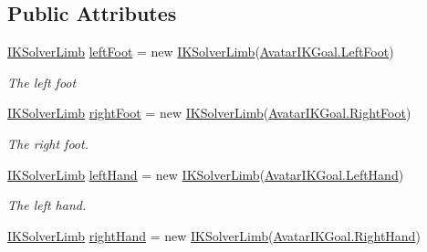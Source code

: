 \subsection*{Public Attributes}
\begin{DoxyCompactItemize}
\item 
\mbox{\hyperlink{class_root_motion_1_1_final_i_k_1_1_i_k_solver_limb}{I\+K\+Solver\+Limb}} \mbox{\hyperlink{class_root_motion_1_1_final_i_k_1_1_biped_i_k_solvers_aec701b71b2b3697df1ff49632cb41468}{left\+Foot}} = new \mbox{\hyperlink{class_root_motion_1_1_final_i_k_1_1_i_k_solver_limb}{I\+K\+Solver\+Limb}}(\mbox{\hyperlink{namespace_root_motion_1_1_final_i_k_ae0dd2058c7667b6f132c11a6b860c14aae81960506fa9c17a1fa39c529ae1bf50}{Avatar\+I\+K\+Goal.\+Left\+Foot}})
\begin{DoxyCompactList}\small\item\em The left foot \end{DoxyCompactList}\item 
\mbox{\hyperlink{class_root_motion_1_1_final_i_k_1_1_i_k_solver_limb}{I\+K\+Solver\+Limb}} \mbox{\hyperlink{class_root_motion_1_1_final_i_k_1_1_biped_i_k_solvers_a0d2177edd1129de6be2b44c965337b1e}{right\+Foot}} = new \mbox{\hyperlink{class_root_motion_1_1_final_i_k_1_1_i_k_solver_limb}{I\+K\+Solver\+Limb}}(\mbox{\hyperlink{namespace_root_motion_1_1_final_i_k_ae0dd2058c7667b6f132c11a6b860c14aac901c64cc70540fbd6d7f6c71b047a6a}{Avatar\+I\+K\+Goal.\+Right\+Foot}})
\begin{DoxyCompactList}\small\item\em The right foot. \end{DoxyCompactList}\item 
\mbox{\hyperlink{class_root_motion_1_1_final_i_k_1_1_i_k_solver_limb}{I\+K\+Solver\+Limb}} \mbox{\hyperlink{class_root_motion_1_1_final_i_k_1_1_biped_i_k_solvers_a3aac72ddabdd676c6b6f281fc4b38a60}{left\+Hand}} = new \mbox{\hyperlink{class_root_motion_1_1_final_i_k_1_1_i_k_solver_limb}{I\+K\+Solver\+Limb}}(\mbox{\hyperlink{namespace_root_motion_1_1_final_i_k_ae0dd2058c7667b6f132c11a6b860c14aa03f7bbbc02c9006ea393ec4ef5843d7b}{Avatar\+I\+K\+Goal.\+Left\+Hand}})
\begin{DoxyCompactList}\small\item\em The left hand. \end{DoxyCompactList}\item 
\mbox{\hyperlink{class_root_motion_1_1_final_i_k_1_1_i_k_solver_limb}{I\+K\+Solver\+Limb}} \mbox{\hyperlink{class_root_motion_1_1_final_i_k_1_1_biped_i_k_solvers_a84dcf6cafa7d96e6495acf8fe0b99e88}{right\+Hand}} = new \mbox{\hyperlink{class_root_motion_1_1_final_i_k_1_1_i_k_solver_limb}{I\+K\+Solver\+Limb}}(\mbox{\hyperlink{namespace_root_motion_1_1_final_i_k_ae0dd2058c7667b6f132c11a6b860c14aaa51983e0f69f76a68e55efe2e7b700b5}{Avatar\+I\+K\+Goal.\+Right\+Hand}})

\end{DoxyCompactItemize}
